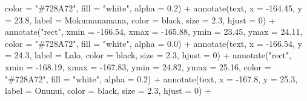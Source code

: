 \documentclass[
]{article}
\newenvironment{Shaded}{\begin{snugshade}}{\end{snugshade}}
\newcommand{\AttributeTok}[1]{\textcolor[rgb]{0.77,0.63,0.00}{#1}}
\newcommand{\DecValTok}[1]{\textcolor[rgb]{0.00,0.00,0.81}{#1}}
\newcommand{\FloatTok}[1]{\textcolor[rgb]{0.00,0.00,0.81}{#1}}
\newcommand{\FunctionTok}[1]{\textcolor[rgb]{0.00,0.00,0.00}{#1}}
\newcommand{\NormalTok}[1]{#1}
\newcommand{\SpecialCharTok}[1]{\textcolor[rgb]{0.00,0.00,0.00}{#1}}
\newcommand{\StringTok}[1]{\textcolor[rgb]{0.31,0.60,0.02}{#1}}
\begin{document}
\begin{Shaded}
\begin{Highlighting}[]
           \AttributeTok{color =} \StringTok{"\#728A72"}\NormalTok{, }\AttributeTok{fill =} \StringTok{"white"}\NormalTok{, }\AttributeTok{alpha =} \FloatTok{0.2}\NormalTok{) }\SpecialCharTok{+}
  \FunctionTok{annotate}\NormalTok{(}\StringTok{\textquotesingle{}text\textquotesingle{}}\NormalTok{, }\AttributeTok{x =} \SpecialCharTok{{-}}\FloatTok{164.45}\NormalTok{, }\AttributeTok{y =} \FloatTok{23.8}\NormalTok{, }
           \AttributeTok{label =} \StringTok{\textquotesingle{}Mokumanamana\textquotesingle{}}\NormalTok{, }\AttributeTok{color =} \StringTok{\textquotesingle{}black\textquotesingle{}}\NormalTok{, }\AttributeTok{size =} \FloatTok{2.3}\NormalTok{, }\AttributeTok{hjust =} \DecValTok{0}\NormalTok{) }\SpecialCharTok{+}
  \FunctionTok{annotate}\NormalTok{(}\StringTok{"rect"}\NormalTok{, }\AttributeTok{xmin =} \SpecialCharTok{{-}}\FloatTok{166.54}\NormalTok{, }\AttributeTok{xmax =} \SpecialCharTok{{-}}\FloatTok{165.88}\NormalTok{, }\AttributeTok{ymin =} \FloatTok{23.45}\NormalTok{, }\AttributeTok{ymax =} \FloatTok{24.11}\NormalTok{, }
           \AttributeTok{color =} \StringTok{"\#728A72"}\NormalTok{, }\AttributeTok{fill =} \StringTok{"white"}\NormalTok{, }\AttributeTok{alpha =} \FloatTok{0.0}\NormalTok{) }\SpecialCharTok{+}
  \FunctionTok{annotate}\NormalTok{(}\StringTok{\textquotesingle{}text\textquotesingle{}}\NormalTok{, }\AttributeTok{x =} \SpecialCharTok{{-}}\FloatTok{166.54}\NormalTok{, }\AttributeTok{y =} \FloatTok{24.3}\NormalTok{, }
           \AttributeTok{label =} \StringTok{\textquotesingle{}Lalo\textquotesingle{}}\NormalTok{, }\AttributeTok{color =} \StringTok{\textquotesingle{}black\textquotesingle{}}\NormalTok{, }\AttributeTok{size =} \FloatTok{2.3}\NormalTok{, }\AttributeTok{hjust =} \DecValTok{0}\NormalTok{) }\SpecialCharTok{+}
  \FunctionTok{annotate}\NormalTok{(}\StringTok{"rect"}\NormalTok{, }\AttributeTok{xmin =} \SpecialCharTok{{-}}\FloatTok{168.19}\NormalTok{, }\AttributeTok{xmax =} \SpecialCharTok{{-}}\FloatTok{167.83}\NormalTok{, }\AttributeTok{ymin =} \FloatTok{24.82}\NormalTok{, }\AttributeTok{ymax =} \FloatTok{25.16}\NormalTok{, }
           \AttributeTok{color =} \StringTok{"\#728A72"}\NormalTok{, }\AttributeTok{fill =} \StringTok{"white"}\NormalTok{, }\AttributeTok{alpha =} \FloatTok{0.2}\NormalTok{) }\SpecialCharTok{+}
  \FunctionTok{annotate}\NormalTok{(}\StringTok{\textquotesingle{}text\textquotesingle{}}\NormalTok{, }\AttributeTok{x =} \SpecialCharTok{{-}}\FloatTok{167.8}\NormalTok{, }\AttributeTok{y =} \FloatTok{25.3}\NormalTok{, }
           \AttributeTok{label =} \StringTok{\textquotesingle{}Onunui\textquotesingle{}}\NormalTok{, }\AttributeTok{color =} \StringTok{\textquotesingle{}black\textquotesingle{}}\NormalTok{, }\AttributeTok{size =} \FloatTok{2.3}\NormalTok{, }\AttributeTok{hjust =} \DecValTok{0}\NormalTok{) }\SpecialCharTok{+}

\end{Highlighting}
\end{Shaded}
\end{document}
